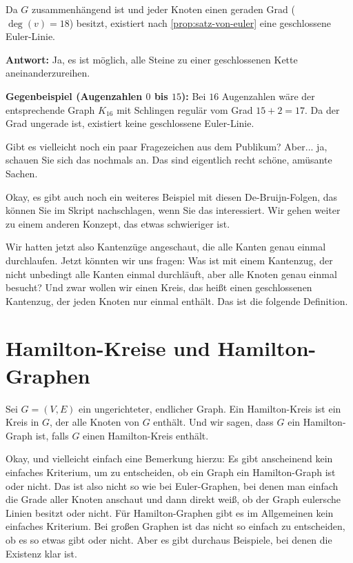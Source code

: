 \begin{math-stroke}
Da $G$ zusammenhängend ist und jeder Knoten einen geraden Grad ($\deg(v) = 18$) besitzt, existiert nach \cref{prop:satz-von-euler} eine geschlossene Euler-Linie.
\par\vspace{1ex}\noindent
\textbf{Antwort:} Ja, es ist möglich, alle Steine zu einer geschlossenen Kette aneinanderzureihen.
\par\vspace{1ex}\noindent
\textbf{Gegenbeispiel (Augenzahlen $0$ bis $15$):} Bei $16$ Augenzahlen wäre der entsprechende Graph $K_{16}$ mit Schlingen regulär vom Grad $15 + 2 = 17$. Da der Grad ungerade ist, existiert keine geschlossene Euler-Linie.
\end{math-stroke}

\begin{spoken-clean}[00:30:15 - 00:31:46]
Gibt es vielleicht noch ein paar Fragezeichen aus dem Publikum? Aber... ja, schauen Sie sich das nochmals an. Das sind eigentlich recht schöne, amüsante Sachen.

Okay, es gibt auch noch ein weiteres Beispiel mit diesen De-Bruijn-Folgen, das können Sie im Skript nachschlagen, wenn Sie das interessiert. Wir gehen weiter zu einem anderen Konzept, das etwas schwieriger ist.

Wir hatten jetzt also Kantenzüge angeschaut, die alle Kanten genau einmal durchlaufen. Jetzt könnten wir uns fragen: Was ist mit einem Kantenzug, der nicht unbedingt alle Kanten einmal durchläuft, aber alle Knoten genau einmal besucht? Und zwar wollen wir einen Kreis, das heißt einen geschlossenen Kantenzug, der jeden Knoten nur einmal enthält. Das ist die folgende Definition.
\end{spoken-clean}

\section{Hamilton-Kreise und Hamilton-Graphen}

\begin{spoken-clean}[00:31:46 - 00:33:32]
Sei $G = (V, E)$ ein ungerichteter, endlicher Graph. Ein Hamilton-Kreis ist ein Kreis in $G$, der alle Knoten von $G$ enthält. Und wir sagen, dass $G$ ein Hamilton-Graph ist, falls $G$ einen Hamilton-Kreis enthält.

Okay, und vielleicht einfach eine Bemerkung hierzu: Es gibt anscheinend kein einfaches Kriterium, um zu entscheiden, ob ein Graph ein Hamilton-Graph ist oder nicht. Das ist also nicht so wie bei Euler-Graphen, bei denen man einfach die Grade aller Knoten anschaut und dann direkt weiß, ob der Graph eulersche Linien besitzt oder nicht. Für Hamilton-Graphen gibt es im Allgemeinen kein einfaches Kriterium. Bei großen Graphen ist das nicht so einfach zu entscheiden, ob es so etwas gibt oder nicht. Aber es gibt durchaus Beispiele, bei denen die Existenz klar ist.
\end{spoken-clean}

